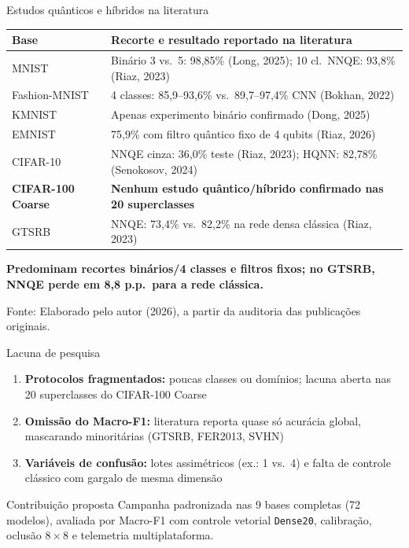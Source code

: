 \documentclass[aspectratio=169,11pt,brazil]{beamer}
\newcommand{\fonte}[1]{\par\vfill{\footnotesize\color{textmuted}Fonte: #1\par}}
\begin{document}
\begin{frame}{Estudos quânticos e híbridos na literatura}
  \centering
  {\footnotesize
  \begin{tabular}{@{}lR{10.5cm}@{}}
    \toprule
    \textbf{Base} & \textbf{Recorte e resultado reportado na literatura} \\
    \midrule
    MNIST & Binário 3 vs.\ 5: 98,85\% (Long, 2025); 10 cl.\ NNQE: 93,8\% (Riaz, 2023) \\
    Fashion-MNIST & 4 classes: 85,9--93,6\% vs.\ 89,7--97,4\% CNN (Bokhan, 2022) \\
    KMNIST & Apenas experimento binário confirmado (Dong, 2025) \\
    EMNIST & 75,9\% com filtro quântico fixo de 4 qubits (Riaz, 2026) \\
    CIFAR-10 & NNQE cinza: 36,0\% teste (Riaz, 2023); HQNN: 82,78\% (Senokosov, 2024) \\
    \textbf{CIFAR-100 Coarse} & \textbf{Nenhum estudo quântico/híbrido confirmado nas 20 superclasses} \\
    GTSRB & NNQE: 73,4\% vs.\ 82,2\% na rede densa clássica (Riaz, 2023) \\
    \bottomrule
  \end{tabular}}
  \vspace{0.18cm}
  {\footnotesize\bfseries\color{senacorange}Predominam recortes binários/4 classes e filtros fixos; no GTSRB, NNQE perde em 8,8 p.p.\ para a rede clássica.}
  \fonte{Elaborado pelo autor (2026), a partir da auditoria das publicações originais.}
\end{frame}

\begin{frame}{Lacuna de pesquisa}
  \small
  \begin{enumerate}\setlength{\itemsep}{6pt}
    \item \textbf{Protocolos fragmentados:} poucas classes ou domínios; lacuna aberta nas 20 superclasses do CIFAR-100 Coarse
    \item \textbf{Omissão do Macro-F1:} literatura reporta quase só acurácia global, mascarando minoritárias (GTSRB, FER2013, SVHN)
    \item \textbf{Variáveis de confusão:} lotes assimétricos (ex.: 1 vs.\ 4) e falta de controle clássico com gargalo de mesma dimensão
  \end{enumerate}
  \vspace{0.25cm}
  \begin{block}{Contribuição proposta}
    Campanha padronizada nas 9 bases completas (72 modelos), avaliada por Macro-F1 com controle vetorial \texttt{Dense20}, calibração, oclusão $8\times 8$ e telemetria multiplataforma.
  \end{block}
\end{frame}
\end{document}
